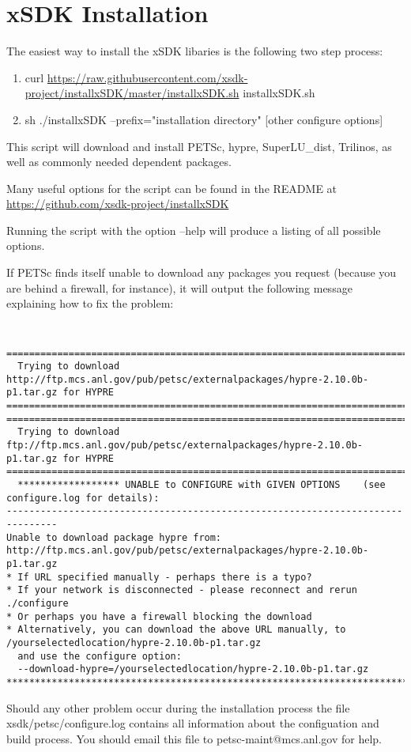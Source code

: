 \chapter{xSDK Installation}


The easiest way to install the xSDK libaries is the following two step process:

\begin{enumerate}
  \item curl \url{https://raw.githubusercontent.com/xsdk-project/installxSDK/master/installxSDK.sh} \> installxSDK.sh
  \item sh ./installxSDK --prefix="installation directory" [other configure options]
\end{enumerate}

This script will download and install PETSc, hypre, SuperLU\_dist, Trilinos, as well as commonly needed dependent packages.

Many useful options for the script can be found in the README at \url{https://github.com/xsdk-project/installxSDK}

Running the script with the option --help will produce a listing of all possible options.

If PETSc finds itself unable to download any packages you request (because you
are behind a firewall, for instance), it will output the following message
explaining how to fix the problem:

{\tt \scriptsize
\begin{verbatim}
===============================================================================                                                                
  Trying to download http://ftp.mcs.anl.gov/pub/petsc/externalpackages/hypre-2.10.0b-p1.tar.gz for HYPRE 
=============================================================================== 
===============================================================================                                                                
  Trying to download ftp://ftp.mcs.anl.gov/pub/petsc/externalpackages/hypre-2.10.0b-p1.tar.gz for HYPRE 
===============================================================================                                                                                                                                                                                                 
  ****************** UNABLE to CONFIGURE with GIVEN OPTIONS    (see configure.log for details):
-------------------------------------------------------------------------------
Unable to download package hypre from: http://ftp.mcs.anl.gov/pub/petsc/externalpackages/hypre-2.10.0b-p1.tar.gz
* If URL specified manually - perhaps there is a typo?
* If your network is disconnected - please reconnect and rerun ./configure
* Or perhaps you have a firewall blocking the download
* Alternatively, you can download the above URL manually, to /yourselectedlocation/hypre-2.10.0b-p1.tar.gz
  and use the configure option:
  --download-hypre=/yourselectedlocation/hypre-2.10.0b-p1.tar.gz
*******************************************************************************
\end{verbatim}
}

Should any other problem occur during the installation process the
file xsdk/petsc/configure.log contains all information about the
configuation and build process. You should email this file to
petsc-maint@mcs.anl.gov for help.


